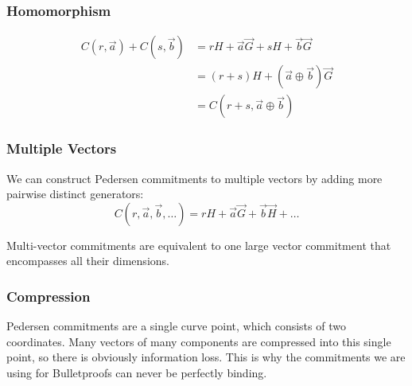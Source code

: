 \subsubsection{Homomorphism}

\begin{align*}
    C(r, \vec{a}) + C(s, \vec{b})
    &= rH + \vec{a}\vec{G} + sH + \vec{b}\vec{G} \\
    &= (r + s)H + (\vec{a} \oplus \vec{b})\vec{G} \\
    &= C(r + s, \vec{a} \oplus \vec{b})
\end{align*}

\subsubsection{Multiple Vectors}

We can construct Pedersen commitments to multiple vectors by adding more pairwise distinct generators:
\[
    C(r, \vec{a}, \vec{b}, \ldots) = rH + \vec{a}\vec{G} + \vec{b}\vec{H} + \ldots
\]

Multi-vector commitments are equivalent to one large vector commitment that encompasses all their dimensions.

\subsubsection{Compression}

Pedersen commitments are a single curve point, which consists of two coordinates.
Many vectors of many components are compressed into this single point, so there is obviously information loss.
This is why the commitments we are using for Bulletproofs can never be perfectly binding.
